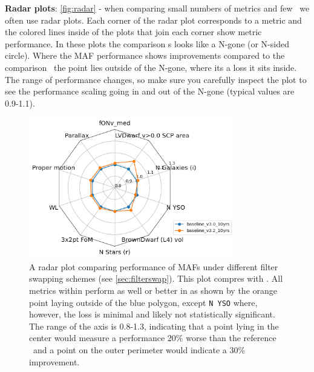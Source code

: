 \FloatBarrier

{\bf Radar plots}: \autoref{fig:radar} - when comparing small numbers of metrics and few \opsim\ we often use radar plots. Each corner of the radar plot corresponds to a metric and the colored lines inside of the plots that join each corner show metric performance. In these plots the comparison \opsim s looks like a N-gone (or N-sided circle). Where the MAF performance shows improvements compared to the comparison \opsim\ the point lies outside of the N-gone, where its a loss it sits inside. The range of performance changes, so make sure you carefully inspect the plot to see the performance scaling going in and out of the N-gone (typical values are 0.9-1.1). 

\begin{figure}
\centering
\includegraphics[width=0.8\textwidth]{figures/radarplot.png}
\caption{A radar plot comparing performance of MAFs under different filter swapping schemes (see \autoref{sec:filterswap}). This plot compres  with . All metrics within perform as well or better in  as shown by the orange point laying outside of the blue polygon, except \texttt{N YSO} where, however, the loss is minimal and likely not statistically significant. The range of the axis is 0.8-1.3, indicating that a point lying in the center would measure a performance 20\% worse than the reference \opsim\ and a point on the outer perimeter would indicate a 30\% improvement.}
\label{fig:radar}
\end{figure}

\FloatBarrier



